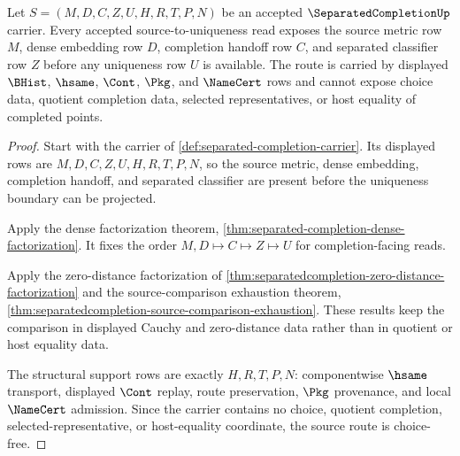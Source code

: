 \begin{theorem}
\label{thm:separatedcompletion-choice-free-source-route}
Let $S=(M,D,C,Z,U,H,R,T,P,N)$ be an accepted $\SeparatedCompletionUp$ carrier. Every accepted source-to-uniqueness read exposes the source metric row $M$, dense embedding row $D$, completion handoff row $C$, and separated classifier row $Z$ before any uniqueness row $U$ is available. The route is carried by displayed $\BHist$, $\hsame$, $\Cont$, $\Pkg$, and $\NameCert$ rows and cannot expose choice data, quotient completion data, selected representatives, or host equality of completed points.
\end{theorem}
\begin{proof}
Start with the carrier of \autoref{def:separated-completion-carrier}. Its displayed rows are $M,D,C,Z,U,H,R,T,P,N$, so the source metric, dense embedding, completion handoff, and separated classifier are present before the uniqueness boundary can be projected.

Apply the dense factorization theorem, \autoref{thm:separated-completion-dense-factorization}. It fixes the order $M,D\mapsto C\mapsto Z\mapsto U$ for completion-facing reads.

Apply the zero-distance factorization of \autoref{thm:separatedcompletion-zero-distance-factorization} and the source-comparison exhaustion theorem, \autoref{thm:separatedcompletion-source-comparison-exhaustion}. These results keep the comparison in displayed Cauchy and zero-distance data rather than in quotient or host equality data.

The structural support rows are exactly $H,R,T,P,N$: componentwise $\hsame$ transport, displayed $\Cont$ replay, route preservation, $\Pkg$ provenance, and local $\NameCert$ admission. Since the carrier contains no choice, quotient completion, selected-representative, or host-equality coordinate, the source route is choice-free.
\end{proof}

